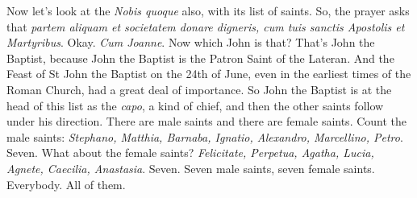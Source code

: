 Now let's look at the \emph{Nobis quoque} also, with its list of saints. So, the prayer asks that \emph{partem aliquam et societatem donare digneris, cum tuis sanctis Apostolis et Martyribus}. Okay. \emph{Cum Joanne}. Now which John is that? That's John the Baptist, because John the Baptist is the Patron Saint of the Lateran. And the Feast of St John the Baptist on the 24th of June, even in the earliest times of the Roman Church, had a great deal of importance. So John the Baptist is at the head of this list as the \emph{capo}, a kind of chief, and then the other saints follow under his direction. There are male saints and there are female saints. Count the male saints: \emph{Stephano, Matthia, Barnaba, Ignatio, Alexandro, Marcellino, Petro}. Seven. What about the female saints? \emph{Felicitate, Perpetua, Agatha, Lucia, Agnete, Caecilia, Anastasia}. Seven. Seven male saints, seven female saints. Everybody. All of them.







